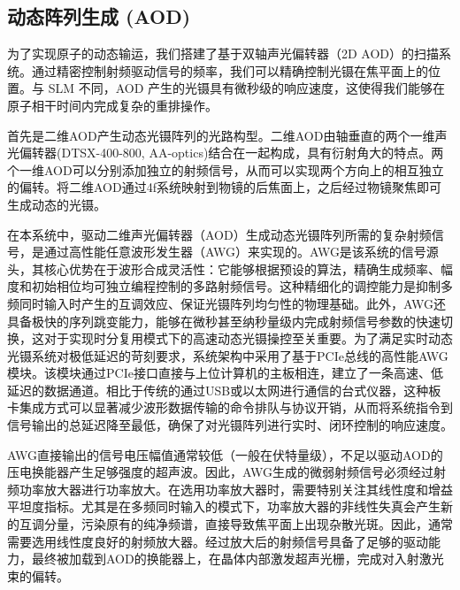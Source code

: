 \documentclass[../main.tex]{subfiles}
\begin{document}
\subsection{动态阵列生成 (AOD)}
\label{ch3:sec:aod_generation}

为了实现原子的动态输运，我们搭建了基于双轴声光偏转器（2D AOD）的扫描系统。通过精密控制射频驱动信号的频率，我们可以精确控制光镊在焦平面上的位置。与 SLM 不同，AOD 产生的光镊具有微秒级的响应速度，这使得我们能够在原子相干时间内完成复杂的重排操作。

首先是二维AOD产生动态光镊阵列的光路构型。二维AOD由轴垂直的两个一维声光偏转器(DTSX-400-800, AA-optics)结合在一起构成，具有衍射角大的特点。两个一维AOD可以分别添加独立的射频信号，从而可以实现两个方向上的相互独立的偏转。将二维AOD通过4f系统映射到物镜的后焦面上，之后经过物镜聚焦即可生成动态的光镊。


在本系统中，驱动二维声光偏转器（AOD）生成动态光镊阵列所需的复杂射频信号，是通过高性能任意波形发生器（AWG）来实现的。AWG是该系统的信号源头，其核心优势在于波形合成灵活性：它能够根据预设的算法，精确生成频率、幅度和初始相位均可独立编程控制的多路射频信号。这种精细化的调控能力是抑制多频同时输入时产生的互调效应、保证光镊阵列均匀性的物理基础。此外，AWG还具备极快的序列跳变能力，能够在微秒甚至纳秒量级内完成射频信号参数的快速切换，这对于实现时分复用模式下的高速动态光镊操控至关重要。为了满足实时动态光镊系统对极低延迟的苛刻要求，系统架构中采用了基于PCIe总线的高性能AWG模块。该模块通过PCIe接口直接与上位计算机的主板相连，建立了一条高速、低延迟的数据通道。相比于传统的通过USB或以太网进行通信的台式仪器，这种板卡集成方式可以显著减少波形数据传输的命令排队与协议开销，从而将系统指令到信号输出的总延迟降至最低，确保了对光镊阵列进行实时、闭环控制的响应速度。

AWG直接输出的信号电压幅值通常较低（一般在伏特量级），不足以驱动AOD的压电换能器产生足够强度的超声波。因此，AWG生成的微弱射频信号必须经过射频功率放大器进行功率放大。在选用功率放大器时，需要特别关注其线性度和增益平坦度指标。尤其是在多频同时输入的模式下，功率放大器的非线性失真会产生新的互调分量，污染原有的纯净频谱，直接导致焦平面上出现杂散光斑。因此，通常需要选用线性度良好的射频放大器。经过放大后的射频信号具备了足够的驱动能力，最终被加载到AOD的换能器上，在晶体内部激发超声光栅，完成对入射激光束的偏转。
\end{document}
